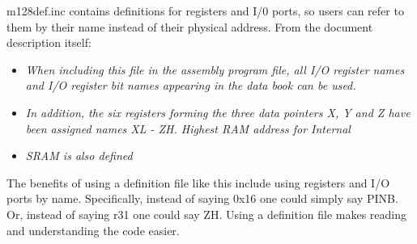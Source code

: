\documentclass[12pt,letterpaper]{article}
\begin{document}
\begin{enumerate}
	m128def.inc contains definitions for registers and I/0 ports, so users can refer to them by their name instead of their physical address. From the document description itself:
	
	\begin{itemize}
	 	\item \textit{When including this file in the assembly program file, all I/O register names and I/O register bit names appearing in the data book can be used.}
		\item\textit{ In addition, the six registers forming the three data pointers X, Y and Z have been assigned names XL - ZH. Highest RAM address for Internal }
		\item\textit{ SRAM is also defined}
	\end{itemize}

	The benefits of using a definition file like this include using registers and I/O ports by name. Specifically, instead of saying 0x16 one could simply say PINB.
	Or, instead of saying r31 one could say ZH.
	Using a definition file makes reading and understanding the code easier.


\end{enumerate}
\end{document}
